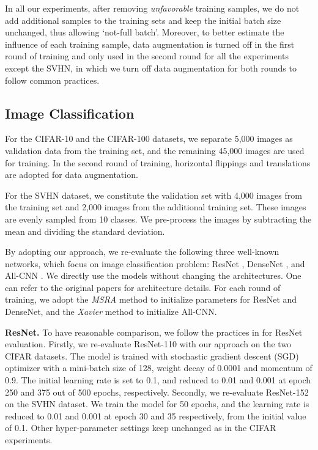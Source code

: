 \documentclass[10pt, conference, letterpaper]{IEEEtran}
\begin{document}
In all our experiments, after removing \emph{unfavorable} training samples, we do not add additional samples to the training sets and keep the initial batch size unchanged, thus allowing \textquoteleft not-full batch\textquoteright. Moreover, to better estimate the influence of each training sample, data augmentation is turned off in the first round of training and only used in the second round for all the experiments except the SVHN, in which we turn off data augmentation for both rounds to follow common practices.

\subsection{Image Classification}
For the CIFAR-10 and the CIFAR-100 datasets, we separate 5,000 images as validation data from the training set, and the remaining 45,000 images are used for training. In the second round of training, horizontal flippings and translations are adopted for data augmentation.

For the SVHN dataset, we constitute the validation set with 4,000 images from the training set and 2,000 images from the additional training set. These images are evenly sampled from 10 classes. We pre-process the images by subtracting the mean and dividing the standard deviation.

By adopting our approach, we re-evaluate the following three well-known networks, which focus on image classification problem: ResNet \cite{he2016deep}, DenseNet \cite{huang2017densely}, and All-CNN \cite{springenberg2014striving}. We directly use the models without changing the architectures. One can refer to the original papers for architecture details. For each round of training, we adopt the \emph{MSRA} method \cite{he2015delving} to initialize parameters for ResNet and DenseNet, and the \emph{Xavier} method \cite{glorot2010understanding} to initialize All-CNN.

\vspace{6pt}
\noindent\textbf{ResNet.} To have reasonable comparison, we follow the practices in \cite{huang2016deep} for ResNet evaluation. Firstly, we re-evaluate ResNet-110 with our approach on the two CIFAR datasets. The model is trained with stochastic gradient descent (SGD) optimizer with a mini-batch size of 128, weight decay of 0.0001 and momentum of 0.9. The initial learning rate is set to 0.1, and reduced to 0.01 and 0.001 at epoch 250 and 375 out of 500 epochs, respectively. Secondly, we re-evaluate ResNet-152 on the SVHN dataset. We train the model for 50 epochs, and the learning rate is reduced to 0.01 and 0.001 at epoch 30 and 35 respectively, from the initial value of 0.1. Other hyper-parameter settings keep unchanged as in the CIFAR experiments.
\end{document}
